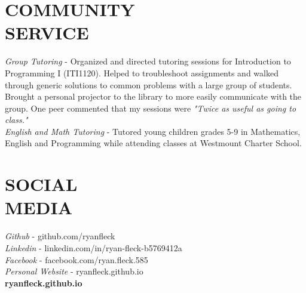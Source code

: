 \documentclass[margin]{res}
\begin{document}
\begin{resume}
 \section{COMMUNITY \\ SERVICE}  {\sl Group Tutoring} - Organized and directed tutoring sessions for Introduction to Programming I (ITI1120). Helped to troubleshoot assignments and walked through generic solutions to common problems with a large group of students. Brought a personal projector to the library to more easily communicate with the group. One peer commented that my sessions were {\sl "Twice as useful as going to class."}\\
{\sl English and Math Tutoring} - Tutored young children grades 5-9 in Mathematics, English and Programming while attending classes at Westmount Charter School.


           	
\section{SOCIAL \\ MEDIA}        
{\sl Github} - github.com/ryanfleck \\
{\sl Linkedin} - linkedin.com/in/ryan-fleck-b5769412a \\
{\sl Facebook} - facebook.com/ryan.fleck.585 \\
{\sl Personal Website} - ryanfleck.github.io \\
 
 \vfill
 {\hfill\large\bf ryanfleck.github.io}
 

\end{resume}
\end{document}
